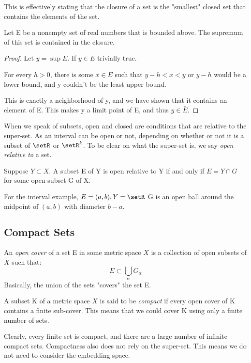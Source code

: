 \documentclass[12pt, letterpaper]{paper}
\begin{document}
This is effectively stating that the closure of a set is the
"smallest" closed set that contains the elements of the set.


\begin{theorem}
  \label{thr:2.28}
  Let E be a nonempty set of real numbers that is bounded above.  The
  supremum of this set is contained in the closure.
\end{theorem}
\begin{proof}
  Let $y=\sup{E}$. If $y \in E$ trivially true.

  For every $h > 0$, there is some $x \in E$ such that $y-h < x <y$ or
  $y-h$ would be a lower bound, and y couldn't be the least upper
  bound.

  This is exactly a neighborhood of y, and we have shown that it
  contains an element of E. This makes y a limit point of E, and thus
  $y \in \bar{E}$.
\end{proof}

When we speak of subsets, open and closed are conditions that are
relative to the super-set. As an interval can be open or not,
depending on whether or not it is a subset of $\setR$ or
$\setR^{k}$. To be clear on what the super-set is, we say \emph{open
  relative to} a set.

\begin{theorem}
  \label{thr:2.30}
  Suppose $Y\subset X$. A subset E of Y is open relative to Y if and
  only if $E = Y \cap G$ for some open subset G of X.
\end{theorem}

For the interval example, $E = (a,b), Y = \setR$ G is an open ball
around the midpoint of $(a,b)$ with diameter $b-a$.

\subsection{Compact Sets}
\label{sec:orgd64ebef}

An \emph{open cover} of a set E in some metric space $X$ is a
collection of open subsets of $X$ such that:
\begin{equation*}
  E \subset \bigcup_{\alpha} G_{\alpha}
\end{equation*}
Basically, the union of the sets "covers" the set E.

A subset K of a metric space $X$ is said to be \emph{compact} if every
open cover of K contains a finite sub-cover. This means that we could
cover K using only a finite number of sets.

Clearly, every finite set is compact, and there are a large number of
infinite compact sets. Compactness also does not rely on the
super-set. This means we do not need to consider the embedding space.
\end{document}
